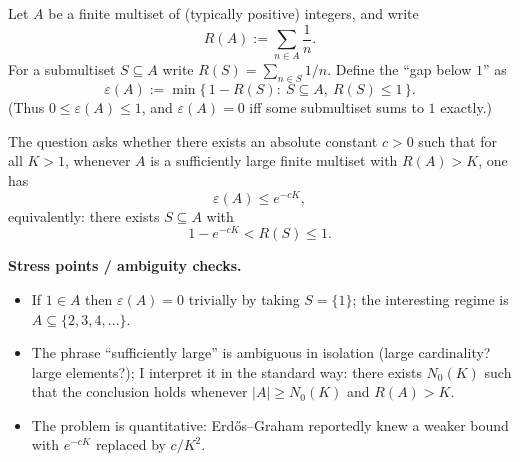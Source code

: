 Let $A$ be a finite multiset of (typically positive) integers, and write
\[
R(A):=\sum_{n\in A}\frac1n.
\]
For a submultiset $S\subseteq A$ write $R(S)=\sum_{n\in S}1/n$. Define the ``gap below $1$'' as
\[
\varepsilon(A):=\min\{\,1-R(S):\ S\subseteq A,\ R(S)\le 1\,\}.
\]
(Thus $0\le \varepsilon(A)\le 1$, and $\varepsilon(A)=0$ iff some submultiset sums to $1$ exactly.)

The question asks whether there exists an absolute constant $c>0$ such that for all $K>1$,
whenever $A$ is a sufficiently large finite multiset with $R(A)>K$, one has
\[
\varepsilon(A)\le e^{-cK},
\]
equivalently: there exists $S\subseteq A$ with
\[
1-e^{-cK}<R(S)\le 1.
\]

\textbf{Stress points / ambiguity checks.}
\begin{itemize}
\item If $1\in A$ then $\varepsilon(A)=0$ trivially by taking $S=\{1\}$; the interesting regime is $A\subseteq\{2,3,4,\dots\}$.
\item The phrase ``sufficiently large'' is ambiguous in isolation (large cardinality? large elements?); I interpret it in the standard way: there exists $N_0(K)$ such that the conclusion holds whenever $|A|\ge N_0(K)$ and $R(A)>K$.
\item The problem is quantitative: Erd\H{o}s--Graham reportedly knew a weaker bound with $e^{-cK}$ replaced by $c/K^2$.
\end{itemize}
